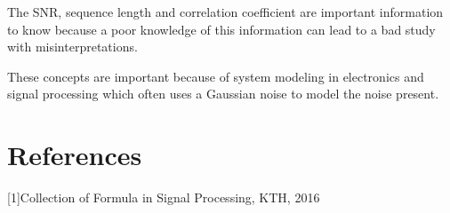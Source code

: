 \documentclass[onecolumn, 12pt]{IEEEtran}
\begin{document}
The SNR, sequence length and correlation coefficient are important information to know because a poor knowledge of this information can lead to a bad study with misinterpretations.
\newline

These concepts are important because of system modeling in electronics and signal processing which often uses a Gaussian noise to model the noise present.

\section{References}
[1]\quad Collection of Formula in Signal Processing, KTH, 2016


%
%
%
%
%
%
%
%
%	
%
%
%
\end{document}
